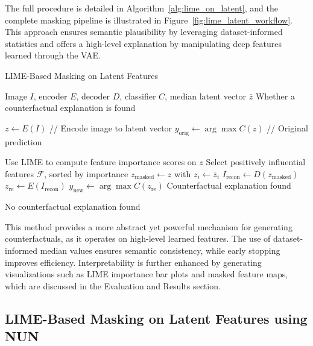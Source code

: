 The full procedure is detailed in Algorithm~\ref{alg:lime_on_latent}, and the complete masking pipeline is illustrated in Figure~\ref{fig:lime_latent_workflow}. This approach ensures semantic plausibility by leveraging dataset-informed statistics and offers a high-level explanation by manipulating deep features learned through the VAE.


\vspace{1em}
\begin{algorithm}[H]
\caption{LIME-Based Masking on Latent Features}
\label{alg:lime_on_latent}
\begin{algorithmic}[1]
\REQUIRE Image $I$, encoder $E$, decoder $D$, classifier $C$, median latent vector $\bar{z}$
\ENSURE Whether a counterfactual explanation is found

\STATE $z \leftarrow E(I)$ \hfill // Encode image to latent vector
\STATE $y_{\text{orig}} \leftarrow \arg\max C(z)$ \hfill // Original prediction

\STATE Use LIME to compute feature importance scores on $z$
\STATE Select positively influential features $\mathcal{F}$, sorted by importance
    \STATE $z_{\text{masked}} \leftarrow z$ with $z_i \leftarrow \bar{z}_i$
    \STATE $I_{\text{recon}} \leftarrow D(z_{\text{masked}})$
    \STATE $z_{\text{re}} \leftarrow E(I_{\text{recon}})$
    \STATE $y_{\text{new}} \leftarrow \arg\max C(z_{\text{re}})$
        \RETURN Counterfactual explanation found
    \ENDIF
\ENDFOR

\RETURN No counterfactual explanation found
\end{algorithmic}
\end{algorithm}
\vspace{1em}

This method provides a more abstract yet powerful mechanism for generating counterfactuals, as it operates on high-level learned features. The use of dataset-informed median values ensures semantic consistency, while early stopping improves efficiency. Interpretability is further enhanced by generating visualizations such as LIME importance bar plots and masked feature maps, which are discussed in the Evaluation and Results section.






\subsection{LIME-Based Masking on Latent Features using NUN} \label{lime_with_NUN}



